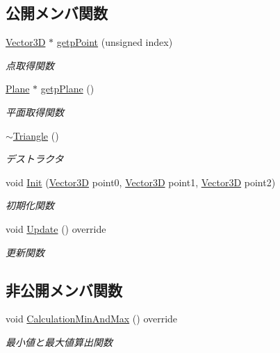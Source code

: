 \subsection*{公開メンバ関数}
\begin{DoxyCompactItemize}
\item 
\mbox{\hyperlink{class_vector3_d}{Vector3D}} $\ast$ \mbox{\hyperlink{class_triangle_a6975e48159ebbeeecce96691e039606a}{getp\+Point}} (unsigned index)
\begin{DoxyCompactList}\small\item\em 点取得関数 \end{DoxyCompactList}\item 
\mbox{\hyperlink{class_plane}{Plane}} $\ast$ \mbox{\hyperlink{class_triangle_a4d0713aa2052d4b6cbde72202bcaca20}{getp\+Plane}} ()
\begin{DoxyCompactList}\small\item\em 平面取得関数 \end{DoxyCompactList}\item 
\mbox{\hyperlink{class_triangle_a5199760a17454f4dc94c855a57e3a152}{$\sim$\+Triangle}} ()
\begin{DoxyCompactList}\small\item\em デストラクタ \end{DoxyCompactList}\item 
void \mbox{\hyperlink{class_triangle_a4df576d68ba444035c7870f503451362}{Init}} (\mbox{\hyperlink{class_vector3_d}{Vector3D}} point0, \mbox{\hyperlink{class_vector3_d}{Vector3D}} point1, \mbox{\hyperlink{class_vector3_d}{Vector3D}} point2)
\begin{DoxyCompactList}\small\item\em 初期化関数 \end{DoxyCompactList}\item 
void \mbox{\hyperlink{class_triangle_acc4ecbf029aafe3cda4e6a49218e2e0b}{Update}} () override
\begin{DoxyCompactList}\small\item\em 更新関数 \end{DoxyCompactList}\end{DoxyCompactItemize}
\subsection*{非公開メンバ関数}
\begin{DoxyCompactItemize}
\item 
void \mbox{\hyperlink{class_triangle_a8e8c4d3a0bb8a4dfb15429d38a3bdaaa}{Calculation\+Min\+And\+Max}} () override
\begin{DoxyCompactList}\small\item\em 最小値と最大値算出関数 \end{DoxyCompactList}\end{DoxyCompactItemize}
